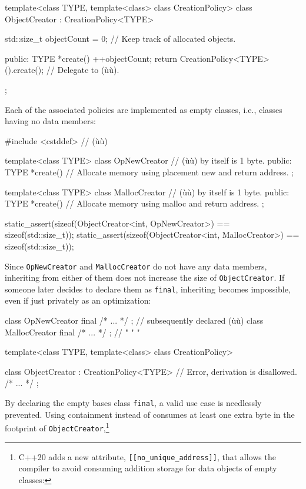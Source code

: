 {\begin{emcppslisting}
template<class TYPE, template<class> class CreationPolicy>
class ObjectCreator : CreationPolicy<TYPE>
{
    std::size_t objectCount = 0;  // Keep track of allocated objects.

public:
    TYPE *create()
    {
        ++objectCount;
        return CreationPolicy<TYPE>().create();  // Delegate to (ù{}ù).
    }
};
\end{emcppslisting}
    

\noindent Each of the associated policies are implemented as empty classes, i.e.,
classes having no data members:

\begin{emcppslisting}
#include <cstddef>  // (ù{}ù)

template<class TYPE>
class OpNewCreator // (ù{}ù) by itself is 1 byte.
{
public:
    TYPE *create()
    {
        // Allocate memory using placement new and return address.
    }
};

template<class TYPE>
class MallocCreator // (ù{}ù) by itself is 1 byte.
{
public:
    TYPE *create()
    {
        // Allocate memory using malloc and return address.
    }
};

static_assert(sizeof(ObjectCreator<int, OpNewCreator>)  == sizeof(std::size_t));
static_assert(sizeof(ObjectCreator<int, MallocCreator>) == sizeof(std::size_t));
\end{emcppslisting}
    

\noindent Since \lstinline!OpNewCreator! and \lstinline!MallocCreator! do not have any
data members, inheriting from either of them does not increase the size
of \lstinline!ObjectCreator!. If someone later decides to declare them as
\lstinline!final!, inheriting becomes impossible, even if just privately as
an optimization:

\begin{emcppslisting}
class OpNewCreator final { /* ... */ };   // subsequently declared (ù{}ù)
class MallocCreator final { /* ... */ };  //      "           "       "

template<class TYPE, template<class> class CreationPolicy>

class ObjectCreator : CreationPolicy<TYPE>  // Error, derivation is disallowed.
{ /* ... */ };
\end{emcppslisting}
    

\noindent By declaring the empty bases class \lstinline!final!, a valid use case is
needlessly prevented. Using containment instead of  consumes at least one extra byte in the footprint of
\lstinline!ObjectCreator!,{\cprotect\footnote{C++20 adds a new
attribute, \lstinline![[no_unique_address]]!, that allows the compiler
to avoid consuming addition storage for data objects of empty classes:

}}}
